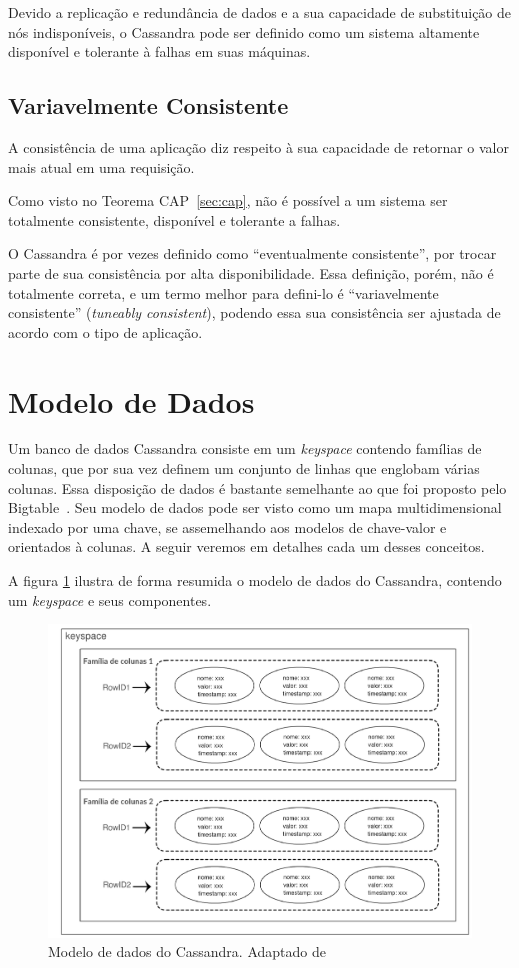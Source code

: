 Devido a replicação e redundância de dados e a sua capacidade de substituição de nós indisponíveis, o Cassandra pode ser definido como um sistema altamente disponível e tolerante à falhas em suas máquinas.

\subsection*{Variavelmente Consistente}
A consistência de uma aplicação diz respeito à sua capacidade de retornar o valor mais atual em uma requisição.

Como visto no Teorema CAP~\ref{sec:cap}, não é possível a um sistema ser totalmente consistente, disponível e tolerante a falhas. 

O Cassandra é por vezes definido como \enquote{eventualmente consistente}, por trocar parte de sua consistência por alta disponibilidade. Essa definição, porém, não é totalmente correta, e um termo melhor para defini-lo é \enquote{variavelmente consistente} (\emph{tuneably consistent}), podendo essa sua consistência ser ajustada de acordo com o tipo de aplicação.

\section{Modelo de Dados}

Um banco de dados Cassandra consiste em um \emph{keyspace} contendo famílias de colunas, que por sua vez definem um conjunto de linhas que englobam várias colunas. Essa disposição de dados é bastante semelhante ao que foi proposto pelo Bigtable~\cite{lakshmancassandra, bigtable}. Seu modelo de dados pode ser visto como um mapa multidimensional indexado por uma chave, se assemelhando aos modelos de chave-valor e orientados à colunas. A seguir veremos em detalhes cada um desses conceitos.

A figura \ref{fig:cassandradm} ilustra de forma resumida o modelo de dados do Cassandra, contendo um \emph{keyspace} e seus componentes. 

\begin{figure}[!htb]
\centering
\includegraphics[width=1\textwidth]{figuras/cassandradatamodel.png}
\caption{Modelo de dados do Cassandra. Adaptado de ~\cite{ibmcassandra}}
\label{fig:cassandradm}
\end{figure}

